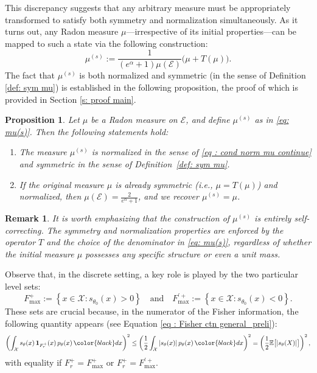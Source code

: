 \documentclass[a4paper, 11pt]{article}
\newtheorem{prop}{Proposition}
\newtheorem{rem}{Remark}
\theoremstyle{definition}
\newcommand{\modar}{\color{black}}
\begin{document}
{{This discrepancy suggests that any arbitrary measure must be appropriately transformed to satisfy both symmetry and normalization simultaneously. As it turns out, any Radon measure $\mu$—irrespective of its initial properties—can be mapped to such a state via the following construction:
\begin{equation}\label{eq: mu(s)}
\mu^{(s)} := \frac{1}{(e^\alpha + 1)\mu(\mathcal{E})} \big( \mu + T(\mu) \big).
\end{equation}
The fact that $\mu^{(s)}$ is both normalized and symmetric (in the sense of Definition \ref{def: sym mu}) is established in the following proposition, the proof of which is provided in Section \ref{s: proof main}.}



\begin{prop}\label{prop: symmetrisée}
Let $\mu$ be a Radon measure on $\mathcal{E}$, and define $\mu^{(s)}$ as in \eqref{eq: mu(s)}. Then the following statements hold:
\begin{enumerate}
    \item The measure $\mu^{(s)}$ is normalized in the sense of \eqref{eq : cond norm mu continue} and symmetric in the sense of Definition~\ref{def: sym mu}.
    \item If the original measure $\mu$ is already symmetric (i.e., $\mu = T(\mu)$) {and normalized}, then $\mu(\mathcal{E}) = \frac{2}{e^\alpha + 1}$, and we recover $\mu^{(s)} = \mu$.
\end{enumerate}
\end{prop}
{\begin{rem}
It is worth emphasizing that the construction of $\mu^{(s)}$ is entirely self-correcting. The symmetry and normalization properties are enforced by the operator $T$ and the choice of the denominator in \eqref{eq: mu(s)}, regardless of whether the initial measure $\mu$ possesses any specific structure or even a unit mass.
\end{rem}}
Observe that, in the discrete setting, a key role is played by the two particular level sets:
\[
F_{\max}^+ := \left\{ x \in \mathcal{X} : s_{\theta_0}(x) > 0 \right\}
\quad \text{and} \quad
F_{\max}^{\prime +} := \left\{ x \in \mathcal{X} : s_{\theta_0}(x) < 0 \right\}.
\]
These sets are crucial because, in the numerator of the Fisher information, the following quantity appears (see Equation \eqref{eq : Fisher ctn general_preli}):
\[
\left( \int_\mathcal{X} s_\theta(x) \, \mathbf{1}_{F^+_r}(x) \, p_\theta(x) \, {\modar dx} \right)^2
\le
\left( \frac{1}{2} \int_\mathcal{X} |s_\theta(x)| \, p_\theta(x) \,  {\modar dx} \right)^2
= \left( \frac{1}{2} \mathbb{E}\bigl[|s_\theta(X)|\bigr] \right)^2,
\]
with equality {\modar if}   %
\( F_r^+ = F_{\max}^+ \) or \( F_r^+ = F_{\max}^{\prime +} \).  

}
\end{document}

